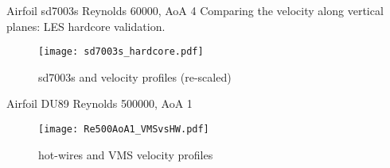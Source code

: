 \begin{frame}{Airfoil sd7003s Reynolds 60000, AoA 4}
        Comparing the velocity along vertical planes: LES hardcore validation.

        \begin{figure}[h]
            \centering          
                \centering
                \texttt{[image: sd7003s\_hardcore.pdf]}
                \caption{sd7003s and velocity profiles (re-scaled)}
            \end{figure} 
\end{frame}

\begin{frame}{Airfoil DU89 Reynolds 500000, AoA 1}
            \begin{figure}[h]
                \centering          
                    \centering
                    \texttt{[image: Re500AoA1\_VMSvsHW.pdf]}
                    \caption{hot-wires and VMS velocity profiles}
                \end{figure} 
\end{frame}


